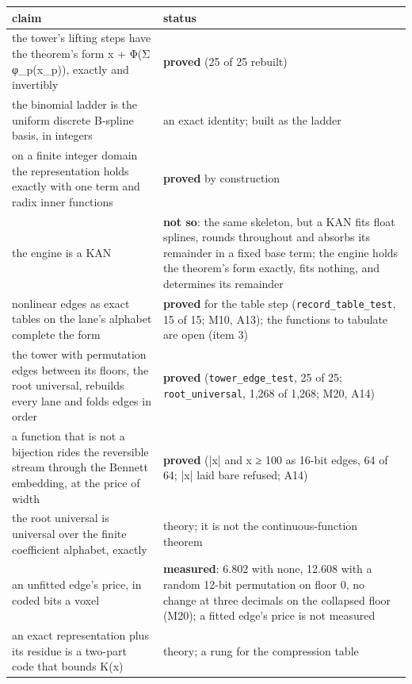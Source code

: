 {\small
\setlength{\tabcolsep}{6pt}
\begin{longtable}{>{\RaggedRight\arraybackslash}p{}>{\RaggedRight\arraybackslash}p{}}
\toprule
claim & status \\
\midrule
\endhead
the tower's lifting steps have the theorem's form x + Φ(Σ φ\_\allowbreak{}p(x\_\allowbreak{}p)), exactly and invertibly & \textbf{proved} (25 of 25 rebuilt) \\
the binomial ladder is the uniform discrete B-spline basis, in integers & an exact identity; built as the ladder \\
on a finite integer domain the representation holds exactly with one term and radix inner functions & \textbf{proved} by construction \\
the engine is a KAN & \textbf{not so}: the same skeleton, but a KAN fits float splines, rounds throughout and absorbs its remainder in a fixed base term; the engine holds the theorem's form exactly, fits nothing, and determines its remainder \\
nonlinear edges as exact tables on the lane's alphabet complete the form & \textbf{proved} for the table step (\texttt{record\_\allowbreak{}table\_\allowbreak{}test}, 15 of 15; M10, A13); the functions to tabulate are open (item 3) \\
the tower with permutation edges between its floors, the root universal, rebuilds every lane and folds edges in order & \textbf{proved} (\texttt{tower\_\allowbreak{}edge\_\allowbreak{}test}, 25 of 25; \texttt{root\_\allowbreak{}universal}, 1,268 of 1,268; M20, A14) \\
a function that is not a bijection rides the reversible stream through the Bennett embedding, at the price of width & \textbf{proved} (|x| and x ≥ 100 as 16-bit edges, 64 of 64; |x| laid bare refused; A14) \\
the root universal is universal over the finite coefficient alphabet, exactly & theory; it is not the continuous-function theorem \\
an unfitted edge's price, in coded bits a voxel & \textbf{measured}: 6.802 with none, 12.608 with a random 12-bit permutation on floor 0, no change at three decimals on the collapsed floor (M20); a fitted edge's price is not measured \\
an exact representation plus its residue is a two-part code that bounds K(x) & theory; a rung for the compression table \\
\bottomrule
\end{longtable}
}

